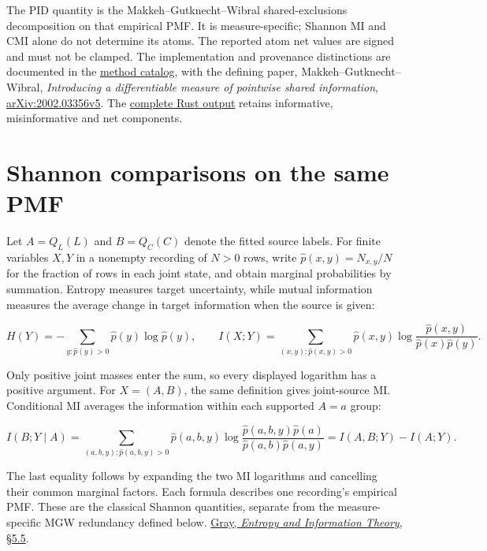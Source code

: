 The PID quantity is the Makkeh--Gutknecht--Wibral shared-exclusions decomposition on that empirical PMF. It is measure-specific; Shannon MI and CMI alone do not determine its atoms. The reported atom net values are signed and must not be clamped. The implementation and provenance distinctions are documented in the \href{https://github.com/sepahead/pid-rs/blob/main/METHODS.md}{method catalog}, with the defining paper, Makkeh--Gutknecht--Wibral, \emph{Introducing a differentiable measure of pointwise shared information}, \href{https://arxiv.org/abs/2002.03356v5}{arXiv:2002.03356v5}. The \href{https://github.com/sepahead/pid-rs/blob/main/audit/evidence/real-occupancy-sensors-example-2026-09-08/runtime-results.json}{complete Rust output} retains informative, misinformative and net components.

\par{}

\section{Shannon comparisons on the same PMF}\label{shannon-comparisons-on-the-same-pmf}

Let \(A=Q_L(L)\) and \(B=Q_C(C)\) denote the fitted source labels. For finite variables \(X,Y\) in a nonempty recording of \(N>0\) rows, write \(\widehat p(x,y)=N_{x,y}/N\) for the fraction of rows in each joint state, and obtain marginal probabilities by summation. Entropy measures target uncertainty, while mutual information measures the average change in target information when the source is given:

\[
H(Y)=-\sum_{y:\widehat p(y)>0}\widehat p(y)\log\widehat p(y),
\qquad
I(X;Y)=\sum_{(x,y):\widehat p(x,y)>0}
\widehat p(x,y)\log\frac{\widehat p(x,y)}{\widehat p(x)\widehat p(y)}.
\]

Only positive joint masses enter the sum, so every displayed logarithm has a positive argument. For \(X=(A,B)\), the same definition gives joint-source MI. Conditional MI averages the information within each supported \(A=a\) group:

\[
I(B;Y\mid A)=\sum_{(a,b,y):\widehat p(a,b,y)>0}
\widehat p(a,b,y)\log
\frac{\widehat p(a,b,y)\widehat p(a)}{\widehat p(a,b)\widehat p(a,y)}
=I(A,B;Y)-I(A;Y).
\]

The last equality follows by expanding the two MI logarithms and cancelling their common marginal factors. Each formula describes one recording's empirical PMF. These are the classical Shannon quantities, separate from the measure-specific MGW redundancy defined below. \href{https://ee.stanford.edu/~gray/it.pdf}{Gray, \emph{Entropy and Information Theory}, §5.5}.

